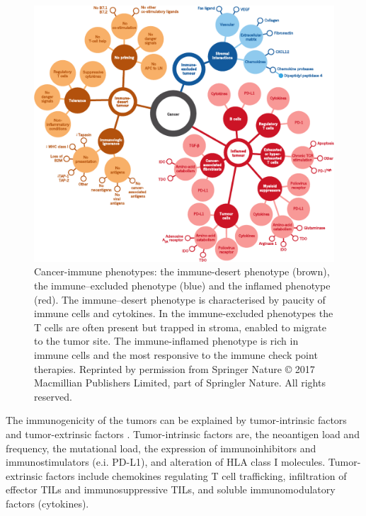 \documentclass[12pt,]{book}
\theoremstyle{definition}
\theoremstyle{definition}
\theoremstyle{definition}
\theoremstyle{remark}
\begin{document}
\begin{figure}

{\centering \includegraphics[width=1\linewidth]{figures-ext/immune-phenotypes} 

}

\caption{Cancer-immune phenotypes: the
immune-desert phenotype (brown), the immune--excluded phenotype (blue)
and the inflamed phenotype (red). The immune--desert phenotype is
characterised by paucity of immune cells and cytokines. In the
immune-excluded phenotypes the T cells are often present but trapped in
stroma, enabled to migrate to the tumor site. The immune-inflamed
phenotype is rich in immune cells and the most responsive to the immune
check point therapies. Reprinted by permission from Springer Nature
\citep{Chen2017} © 2017 Macmillian Publishers Limited, part of Springler
Nature. All rights reserved.}\label{fig:immune-phenotypes}
\end{figure}












The immunogenicity of the tumors can be explained by tumor-intrinsic
factors and tumor-extrinsic factors \citep{Gajewski2006}.
Tumor-intrinsic factors are, the neoantigen load and frequency, the
mutational load, the expression of immunoinhibitors and
immunostimulators (e.i. PD-L1), and alteration of HLA class I molecules.
Tumor-extrinsic factors include chemokines regulating T cell
trafficking, infiltration of effector TILs and immunosuppressive TILs,
and soluble immunomodulatory factors (cytokines).
\end{document}
